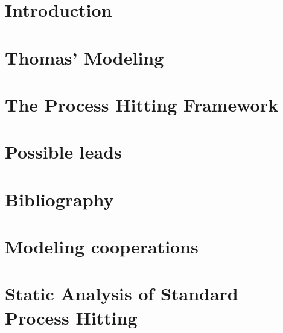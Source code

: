 \documentclass[fleqn,8pt,c]{beamer}
\begin{document}
\section{Introduction}



\section{Thomas' Modeling}



\section{The Process Hitting Framework}




\section{Possible leads}





\appendix
{}
\setcounter{finalframe}{\value{framenumber}}

\section[x]{Bibliography}


\section{Modeling cooperations}


\section{Static Analysis of Standard Process Hitting}


\setcounter{framenumber}{\value{finalframe}}
\end{document}
